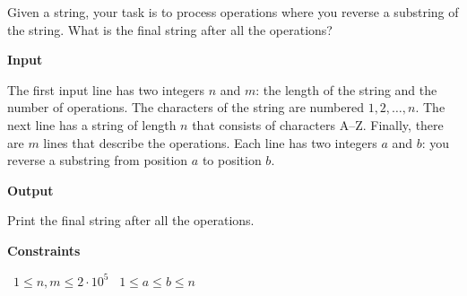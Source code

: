 Given a string, your task is to process operations where you reverse a substring of the string. What is the final string after all the operations?

\vspace{0.3cm}\noindent\textbf{Input}

The first input line has two integers $n$ and $m$: the length of the string and the number of operations. The characters of the string are numbered $1,2,\dots,n$.
The next line has a string of length $n$ that consists of characters A–Z.
Finally, there are $m$ lines that describe the operations. Each line has two integers $a$ and $b$: you reverse a substring from position $a$ to position $b$.

\vspace{0.3cm}\noindent\textbf{Output}

Print the final string after all the operations.

\vspace{0.3cm}\noindent\textbf{Constraints}

\textbullet\ $1 \le n, m \le 2 \cdot 10^5$
\textbullet\ $1 \le a \le b \le n$